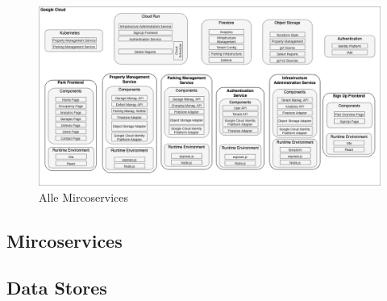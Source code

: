 \begin{figure}[ht]
  \centering
  \includegraphics[width=\textwidth]{resources/03-runtime-view/03-system-architecture.png}
  \caption{Alle Mircoservices}
  \label{fig:system-architecture}
\end{figure}

\subsection{Mircoservices}
\subsection{Data Stores}